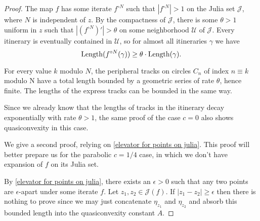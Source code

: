 \begin{proof}

\item The map $f$ has some iterate $f^{\circ N}$ such that $|f^{\circ N}|>1$ on the Julia set $\mathcal{J}$, where $N$ is independent of $z$.
By the compactness of $\mathcal J$, there is some $\theta >1 $ uniform in $z$ such that $\left|(f^{\circ N})'\right|>\theta$ on some neighborhood $\mathcal{U}$ of $\mathcal{J}$.
Every itinerary is eventually contained in $\mathcal{U}$, so for almost all itineraries $\gamma$ we have 
\begin{equation*}
\operatorname{Length} ( f^{\circ N}(\gamma) ) \geq \theta \cdot \operatorname{Length}( \gamma). 
\end{equation*}

For every value $k$ modulo $N$, the peripheral tracks on circles $C_n$ of index $n \equiv k$ modulo N have a total length bounded by a geometric series of rate $\theta$, hence finite. 
The lengths of the express tracks can be bounded in the same way. %

\item Since we already know that the lengths of tracks in the itinerary decay exponentially with rate $\theta>1$, the same proof of the case $c=0$ also shows quasiconvexity in this case.

We give a second proof, relying on \cref{elevator for points on julia}. This proof will better prepare us for the
parabolic $c=1/4$ case, in which we don't have expansion of $f$ on its Julia set.

By \cref{elevator for points on julia}, there exists an $\epsilon>0$ such that any two points are $\epsilon$-apart under some iterate $f$. 
Let $z_{1},z_{2}\in\mathcal{J}(f)$. If $\left|z_{1}-z_{2}\right|\geq\epsilon$ then there is nothing to
prove since we may just concatenate $\eta_{z_{1}}$ and $\eta_{z_{2}}$
and absorb this bounded length into the quasiconvexity constant
$A$. 
\begin{comment}
Explicitly, if $\Length\left(\eta_{z}\right)\leq L$
for all $z\in\mathcal{J}$ then we take $A\geq\frac{2L}{\epsilon}$
and then automatically $\Length\left(\eta_{z_{1}}+\eta_{z_{2}}\right)\leq A\left|z_{1}-z_{2}\right|$.
\end{comment}


\end{proof}
